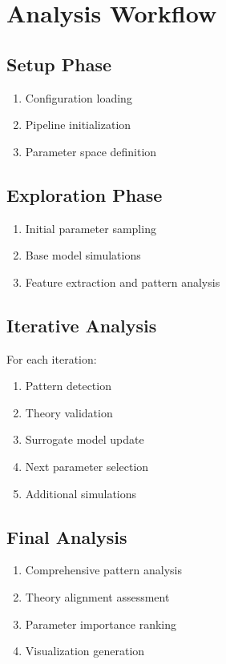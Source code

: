 \documentclass[11pt]{article}
\begin{document}
\section{Analysis Workflow}
\subsection{Setup Phase}
\begin{enumerate}
    \item Configuration loading
    \item Pipeline initialization
    \item Parameter space definition
\end{enumerate}

\subsection{Exploration Phase}
\begin{enumerate}
    \item Initial parameter sampling
    \item Base model simulations
    \item Feature extraction and pattern analysis
\end{enumerate}

\subsection{Iterative Analysis}
For each iteration:
\begin{enumerate}
    \item Pattern detection
    \item Theory validation
    \item Surrogate model update
    \item Next parameter selection
    \item Additional simulations
\end{enumerate}

\subsection{Final Analysis}
\begin{enumerate}
    \item Comprehensive pattern analysis
    \item Theory alignment assessment
    \item Parameter importance ranking
    \item Visualization generation
\end{enumerate}
\end{document}
